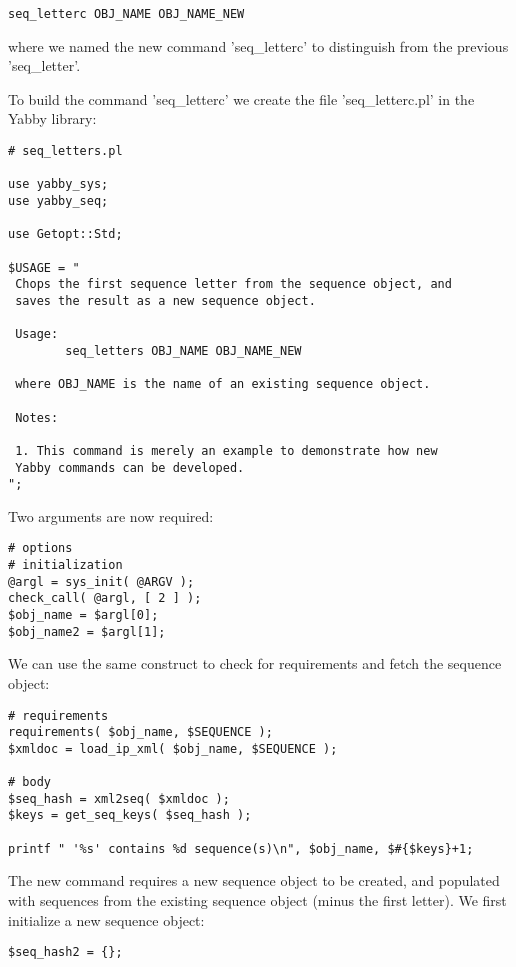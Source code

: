 \begin{verbatim}
seq_letterc OBJ_NAME OBJ_NAME_NEW
\end{verbatim}

where we named the new command 'seq\_letterc' to distinguish from
the previous 'seq\_letter'.

To build the command 'seq\_letterc' we create the file 'seq\_letterc.pl'
in the Yabby library:

\begin{verbatim}
# seq_letters.pl

use yabby_sys;
use yabby_seq;

use Getopt::Std;

$USAGE = "
 Chops the first sequence letter from the sequence object, and
 saves the result as a new sequence object.

 Usage:
        seq_letters OBJ_NAME OBJ_NAME_NEW

 where OBJ_NAME is the name of an existing sequence object.

 Notes:

 1. This command is merely an example to demonstrate how new
 Yabby commands can be developed.
";
\end{verbatim}

Two arguments are now required:

\begin{verbatim}
# options
# initialization
@argl = sys_init( @ARGV );
check_call( @argl, [ 2 ] );
$obj_name = $argl[0];
$obj_name2 = $argl[1];
\end{verbatim}

We can use the same construct to check for requirements and fetch the
sequence object:

\begin{verbatim}
# requirements
requirements( $obj_name, $SEQUENCE );
$xmldoc = load_ip_xml( $obj_name, $SEQUENCE );

# body
$seq_hash = xml2seq( $xmldoc );
$keys = get_seq_keys( $seq_hash );

printf " '%s' contains %d sequence(s)\n", $obj_name, $#{$keys}+1;
\end{verbatim}

The new command requires a new sequence object to be created, and
populated with sequences from the existing sequence object (minus
the first letter). We first initialize a new sequence object:

\begin{verbatim}
$seq_hash2 = {};
\end{verbatim}

